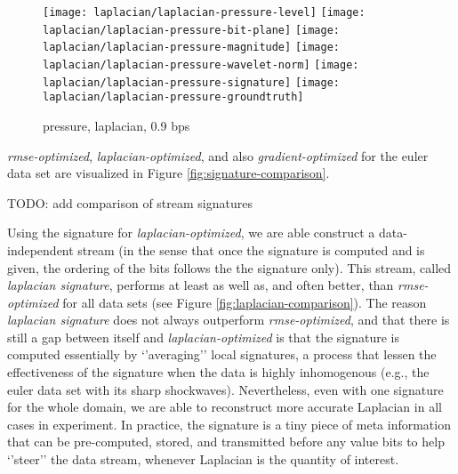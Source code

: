 \begin{figure}[h]
	\centering
	{\texttt{[image: laplacian/laplacian-pressure-level]}}
	{\texttt{[image: laplacian/laplacian-pressure-bit-plane]}}
	{\texttt{[image: laplacian/laplacian-pressure-magnitude]}}
	{\texttt{[image: laplacian/laplacian-pressure-wavelet-norm]}}
	{\texttt{[image: laplacian/laplacian-pressure-signature]}}
	{\texttt{[image: laplacian/laplacian-pressure-groundtruth]}}
	\caption{pressure, laplacian, 0.9 bps}
	\label{fig:laplacian-precision-comparison}
\end{figure}

\emph{rmse-optimized}, \emph{laplacian-optimized}, and also \emph{gradient-optimized} for the euler
data set are visualized in Figure \ref{fig:signature-comparison}. 

TODO: add comparison of stream signatures

Using the signature for \emph{laplacian-optimized}, we are able construct a data-independent stream
(in the sense that once the signature is computed and is given, the ordering of the bits follows the
the signature only). This stream, called \emph{laplacian signature}, performs at least as well as,
and often better, than \emph{rmse-optimized} for all data sets (see Figure
\ref{fig:laplacian-comparison}). The reason \emph{laplacian signature} does not always outperform
\emph{rmse-optimized}, and that there is still a gap between itself and \emph{laplacian-optimized}
is that the signature is computed essentially by `'averaging'' local signatures, a process that
lessen the effectiveness of the signature when the data is highly inhomogenous (e.g., the euler data
set with its sharp shockwaves). Nevertheless, even with one signature for the whole domain, we are
able to reconstruct more accurate Laplacian in all cases in experiment. In practice, the signature
is a tiny piece of meta information that can be pre-computed, stored, and transmitted before any
value bits to help `'steer'' the data stream, whenever Laplacian is the quantity of interest.
